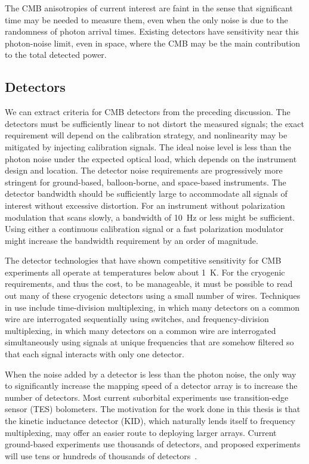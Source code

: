The CMB anisotropies of current interest are faint in the sense that significant time may be needed to measure them, even when the only noise is due to the randomness of photon arrival times.
Existing detectors have sensitivity near this photon-noise limit, even in space, where the CMB may be the main contribution to the total detected power.


\subsection{Detectors}
\label{sec:cmb.experiment.detectors}

We can extract criteria for CMB detectors from the preceding discussion.
The detectors must be sufficiently linear to not distort the measured signals; the exact requirement will depend on the calibration strategy, and nonlinearity may be mitigated by injecting calibration signals.
The ideal noise level is less than the photon noise under the expected optical load, which depends on the instrument design and location.
The detector noise requirements are progressively more stringent for ground-based, balloon-borne, and space-based instruments.
The detector bandwidth should be sufficiently large to accommodate all signals of interest without excessive distortion.
For an instrument without polarization modulation that scans slowly, a bandwidth of \SI{10}{Hz} or less might be sufficient.
Using either a continuous calibration signal or a fast polarization modulator might increase the bandwidth requirement by an order of magnitude.

The detector technologies that have shown competitive sensitivity for CMB experiments all operate at temperatures below about \SI{1}{K}.
For the cryogenic requirements, and thus the cost, to be manageable, it must be possible to read out many of these cryogenic detectors using a small number of wires.
Techniques in use include time-division multiplexing, in which many detectors on a common wire are interrogated sequentially using switches, and frequency-division multiplexing, in which many detectors on a common wire are interrogated simultaneously using signals at unique frequencies that are somehow filtered so that each signal interacts with only one detector.

When the noise added by a detector is less than the photon noise, the only way to significantly increase the mapping speed of a detector array is to increase the number of detectors.
Most current suborbital experiments use transition-edge sensor (TES) bolometers.
The motivation for the work done in this thesis is that the kinetic inductance detector (KID), which naturally lends itself to frequency multiplexing, may offer an easier route to deploying larger arrays.
Current ground-based experiments use thousands of detectors, and proposed experiments will use tens or hundreds of thousands of detectors~\autocite{CMBS4TechnologyBook}.

